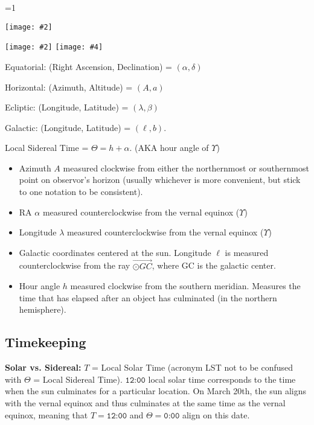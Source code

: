 \documentclass[11pt]{article}
\newcommand{\image}[5][1]{
\ifnum #1=1 
    \begin{center}
        \texttt{[image: \#2]}
    \end{center}
\else
    \begin{center}
        \texttt{[image: \#2]}
        \texttt{[image: \#4]}
    \end{center}
\fi
}
\begin{document}
\image[2]{images/rah.png}{7.5}{images/conversion.png}{7.5}

Equatorial: (Right Ascension, Declination) = $(\alpha, \delta)$

Horizontal: (Azimuth, Altitude) = $(A, a)$

Ecliptic: (Longitude, Latitude) = $(\lambda, \beta)$

Galactic: (Longitude, Latitude) = $(\ell, b)$. 

Local Sidereal Time = $\Theta = h + \alpha$. (AKA hour angle of $\Upsilon$)

\begin{itemize}
\item Azimuth $A$ measured clockwise from either the northernmost or southernmost point on observor's horizon (usually whichever is more convenient, but stick to one notation to be consistent). 

\item RA $\alpha$ measured counterclockwise from the vernal equinox ($\Upsilon$)

\item Longitude $\lambda$ measured counterclockwise from the vernal equinox ($\Upsilon$)

\item Galactic coordinates centered at the sun. Longitude $\ell$ is measured counterclockwise from the ray $\overrightarrow{\odot GC}$, where GC is the galactic center.

\item Hour angle $h$ measured clockwise from the southern meridian. Measures the time that has elapsed after an object has culminated (in the northern hemisphere).
\end{itemize}

\subsection{Timekeeping}

\textbf{Solar vs. Sidereal:} $T$ = Local Solar Time (acronym LST not to be confused with $\Theta$ = Local Sidereal Time). $\texttt{12:00}$ local solar time corresponds to the time when the sun culminates for a particular location. On March 20th, the sun aligns with the vernal equinox and thus culminates at the same time as the vernal equinox, meaning that $T = \texttt{12:00}$ and $\Theta = \texttt{0:00}$ align on this date.
\end{document}
